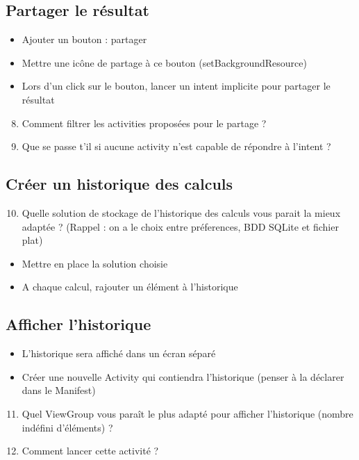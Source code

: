 \documentclass{article}
\begin{document}
\subsection{Partager le résultat}
\begin{itemize}
\item Ajouter un bouton : partager
\item Mettre une icône de partage à ce bouton (setBackgroundResource)
\item Lors d'un click sur le bouton, lancer un intent implicite pour partager le résultat
\end{itemize}
\begin{enumerate}
 \setcounter{enumi}{7}
\item Comment filtrer les activities proposées pour le partage ?
\item Que se passe t'il si aucune activity n'est capable de répondre à l'intent ?
\end{enumerate}
\subsection{Créer un historique des calculs}
\begin{enumerate}
 \setcounter{enumi}{9}
\item Quelle solution de stockage de l'historique des calculs vous parait la mieux adaptée ? (Rappel : on a le choix entre préferences, BDD SQLite et fichier plat) 
\end{enumerate}
\begin{itemize}
\item Mettre en place la solution choisie
\item A chaque calcul, rajouter un élément à l'historique
\end{itemize}
\subsection{Afficher l'historique}
\begin{itemize}
\item L'historique sera affiché dans un écran séparé
\item Créer une nouvelle Activity qui contiendra l'historique (penser à la déclarer dans le Manifest)
\end{itemize}
\begin{enumerate}
 \setcounter{enumi}{10}
\item Quel ViewGroup vous paraît le plus adapté pour afficher l'historique (nombre indéfini d'éléments) ?
\item Comment lancer cette activité ?
\end{enumerate}
\end{document}
